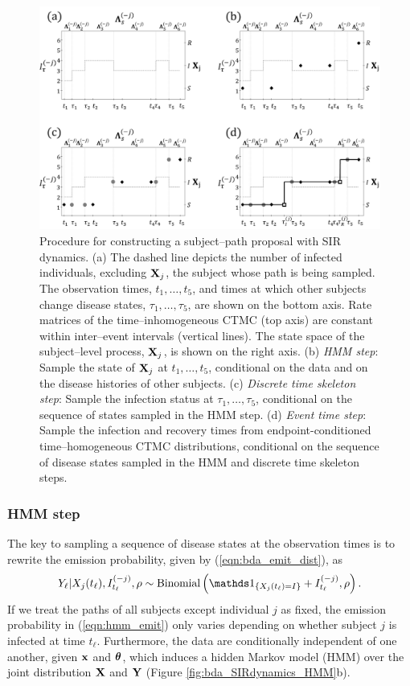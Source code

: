 \begin{figure}[htbp]
	\centering
	\includegraphics[width=0.95\linewidth]{figures/sampling_diagram.pdf}
	\caption[Diagram of subject--path proposals used in fitting models via Bayesian data augmentation.]{Procedure for constructing a subject--path proposal with SIR dynamics. (a) The dashed line depicts the number of infected individuals, excluding $ \mathbf{X}_j $, the subject whose path is being sampled. The observation times, $ t_1,\dots,t_5 $, and times at which other subjects change disease states, $ \tau_1,\dots,\tau_5 $, are shown on the bottom axis. Rate matrices of the time--inhomogeneous CTMC (top axis) are constant within inter--event intervals (vertical lines). The state space of the subject--level process, $ \mathbf{X}_j $, is shown on the right axis. (b) \textit{HMM step}: Sample the state of $ \mathbf{X}_j $ at $ t_1,\dots,t_5 $, conditional on the data and on the disease histories of other subjects. (c) \textit{Discrete time skeleton step}: Sample the infection status at  $ \tau_1,\dots,\tau_5 $, conditional on the sequence of states sampled in the HMM step. (d) \textit{Event time step}: Sample the infection and recovery times from endpoint-conditioned time--homogeneous CTMC distributions, conditional on the sequence of disease states sampled in the HMM and discrete time skeleton steps.}
	\label{fig:sampling_diagram}
\end{figure}

\subsubsection{HMM step}
The key to sampling a sequence of disease states at the observation times is to rewrite the emission probability, given by (\ref{eqn:bda_emit_dist}), as
\begin{equation}\label{eqn:hmm_emit}
Y_\ell| X_j(t_\ell), I_{t_\ell}^{(-j)},\rho \sim \mathrm{Binomial}\left (\ind{X_j(t_\ell)=I} + I_{t_\ell}^{(-j)}, \rho\right ).
\end{equation}
If we treat the paths of all subjects except individual $ j $ as fixed, the emission probability in (\ref{eqn:hmm_emit}) only varies depending on whether subject $ j $ is infected at time $ t_\ell $. Furthermore, the data are conditionally independent of one another, given $ \mathbf{x}$ and $ \boldsymbol{\theta} $, which induces a hidden Markov model (HMM) over the joint distribution $ \mathbf{X} $ and $ \mathbf{Y} $ (Figure \ref{fig:bda_SIRdynamics_HMM}b). 

